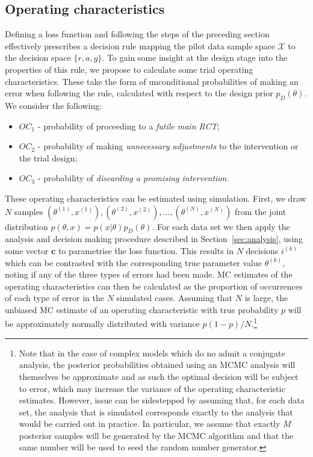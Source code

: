 \documentclass[AMA,STIX1COL]{WileyNJD-v2}
\begin{document}
\subsection{Operating characteristics}\label{sec:evaluation}

Defining a loss function and following the steps of the preceding section effectively prescribes a decision rule mapping the pilot data sample space $\mathcal{X}$ to the decision space $\{r, a, g\}$. To gain some insight at the design stage into the properties of this rule, we propose to calculate some trial operating characteristics. These take the form of unconditional probabilities of making an error when following the rule, calculated with respect to the design prior $p_D(\theta)$. We consider the following:
\begin{itemize}
\item $OC_1$ - probability of proceeding to a \emph{futile main RCT};
\item $OC_2$ - probability of making \emph{unnecessary adjustments} to the intervention or the trial design;
\item $OC_3$ - probability of \emph{discarding a promising intervention}.
\end{itemize}

These operating characteristics can be estimated using simulation. First, we draw $N$ samples $(\theta^{(1)}, x^{(1)}), (\theta^{(2)}, x^{(2)}), \ldots , (\theta^{(N)}, x^{(N)})$ from the joint distribution $p(\theta, x) = p(x | \theta)p_D(\theta)$. For each data set we then apply the analysis and decision making procedure described in Section~\ref{sec:analysis}, using some vector $\mathbf{c}$ to parametrise the loss function. This results in $N$ decisions $i^{(k)}$ which can be contrasted with the corresponding true parameter value $\theta^{(k)}$, noting if any of the three types of errors had been made. MC estimates of the operating characteristics can then be calculated as the proportion of occurrences of each type of error in the $N$ simulated cases. Assuming that $N$ is large, the unbiased MC estimate of an operating characteristic with true probability $p$ will be approximately normally distributed with variance $p(1-p)/N$.\footnote{Note that in the case of complex models which do no admit a conjugate analysis, the posterior probabilities obtained using an MCMC analysis will themselves be approximate and as such the optimal decision will be subject to error, which may increase the variance of the operating characteristic estimates. However, issue can be sidestepped by assuming that, for each data set, the analysis that is simulated corresponds exactly to the analysis that would be carried out in practice. In particular, we assume that exactly $M$ posterior samples will be generated by the MCMC algorithm and that the same number will be used to seed the random number generator.}
\end{document}
